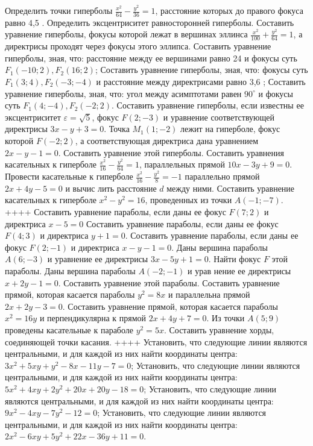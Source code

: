 Определить точки гиперболы $\frac{x^2}{64}-\frac{y^2}{36}=1$, расстояние которых до правого фокуса равно 4,5 .
Определить эксцентриситет равносторонней гиперболы.
Составить уравнение гиперболы, фокусы которой лежат в вершинах эллинса $\frac{x^2}{100}+\frac{y^2}{64}=1$, а директрисы проходят через фокусы этого эллипса.
Составить уравнение гиперболы, зная, что: расстояние между ее вершинами равно 24 и фокусы суть $F_1(-10 ; 2), F_2(16 ; 2)$;
Составить уравнение гиперболы, зная, что: фокусы суть $F_1(3 ; 4), F_2(-3 ;-4)$ и расстояние между директрисами равно 3,6 ;
Составить уравнение гиперболы, зная, что: угол между асимптотами равен $90^{\circ}$ и фокусы суть $F_1(4 ;-4), F_2(-2 ; 2)$.
Составить уравнение гиперболы, если известны ее эксцентриситет $\varepsilon=\sqrt{5}$, фокус $F(2 ;-3)$ и уравнение соответствующей директрисы $3 x-y+3=0$.
Точка $M_1(1 ;-2)$ лежит на гиперболе, фокус которой $F(-2 ; 2)$, а соответствующая директриса дана уравнением $2 x-y-1=0$. Составить уравнение этой гиперболы.
Составить уравнения касательных к гиперболе $\frac{x^2}{16}-\frac{y^2}{64}=1$, параллельных прямой $10 x-3 y+9=0$.
Провести касательные к гиперболе $\frac{x^2}{16}-\frac{y^2}{8}=-1$ параллельно прямой $2 x+4 y-5=0$ и вычис лить расстояние $d$ между ними.
Составить уравнение касательных к гиперболе $x^2-y^2=16$, проведенных из точки $A(-1 ;-7)$.
++++
Составить уравнение параболы, если даны ее фокус $F(7 ; 2)$ и директриса $x-5=0$
Составить уравнение параболы, если даны ее фокус $F(4 ; 3)$ и директриса $y+1=0$.
Составить уравнение параболы, если даны ее фокус $F(2 ;-1)$ и директриса $x-y-1=0$.
Даны вершина параболы $A(6 ;-3)$ и уравнение ее директрисы $3 x-5 y+1=0$. Найти фокус $F$ этой параболы.
Даны вершина параболы $A(-2 ;-1)$ и урав нение ее директрисы $x+2 y-1=0$. Составить уравнение этой параболы.
Составить уравнение прямой, которая касается параболы $y^2=8 x$ и параллельна прямой $2 x+2 y-3=0$.
Составить уравнение прямой, которая касается параболы $x^2=16 y$ и перпендикулярна к прямой $2 x+4 y+7=0$.
Из точки $A(5 ; 9)$ проведены касательные к параболе $y^2=5 x$. Составить уравнение хорды, соединяющей точки касания.
++++
Установить, что следующие линии являются центральными, и для каждой из них найти координаты центра: $3 x^2+5 x y+y^2-8 x-11 y-7=0$;
Установить, что следующие линии являются центральными, и для каждой из них найти координаты центра: $5 x^2+4 x y+2 y^2+20 x+20 y-18=0$;
Установить, что следующие линии являются центральными, и для каждой из них найти координаты центра: $9 x^2-4 x y-7 y^2-12=0$;
Установить, что следующие линии являются центральными, и для каждой из них найти координаты центра: $2 x^2-6 x y+5 y^2+22 x-36 y+11=0$.
